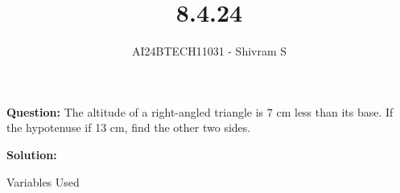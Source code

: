 \documentclass[journal]{IEEEtran}
\begin{document}
\onecolumn

\vspace{3cm}

\renewcommand{\thetable}{\theenumi}

\title{8.4.24}
\author{AI24BTECH11031 - Shivram S}
\maketitle

\renewcommand{\thetable}{\theenumi} 

\setcounter{section}{1}
\textbf{Question: } The altitude of a right-angled triangle is 7 cm less than its base. If the
hypotenuse if 13 cm, find the other two sides.
\bigskip

\textbf{Solution: } 

\begin{table}[h!]    
	\centering
	
	\caption{Variables Used}
\end{table}
\end{document}
